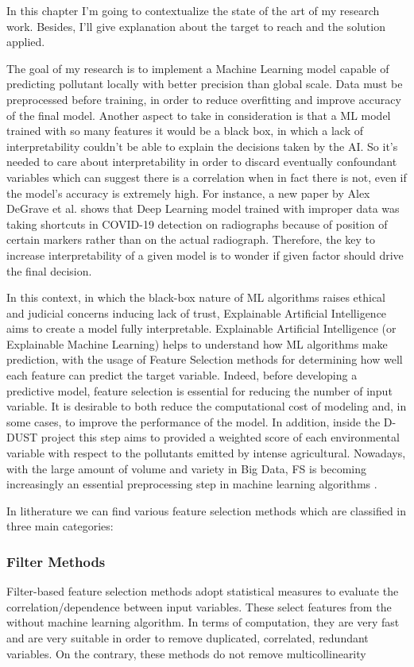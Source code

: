 In this chapter I'm going to contextualize the state of the art of my research work. 
Besides, I'll give explanation about the target to reach and the solution applied.\par
The goal of my research is to implement a Machine Learning model capable of predicting pollutant locally with better precision than global scale. 
Data must be preprocessed before training, in order to reduce overfitting and improve accuracy of the final model.
Another aspect to take in consideration is that a ML model trained with so many features it would be a black box, in which a lack of interpretability couldn't be able to explain the decisions taken by the AI.
So it's needed to care about interpretability in order to discard eventually confoundant variables  which can suggest there is a correlation when in fact there is not, even if the model's accuracy is extremely high. 
For instance, a new paper by Alex DeGrave et al.\cite{degrave2021ai} shows that Deep Learning model trained with improper data was taking shortcuts in COVID-19 detection on radiographs because of position of certain markers rather than on the actual radiograph.
Therefore, the key to increase interpretability of a given model is to wonder if given factor should drive the final decision.\par
In this context, in which the black-box nature of ML algorithms raises ethical and judicial concerns inducing lack of trust, Explainable Artificial Intelligence aims to create a model fully interpretable.
Explainable Artificial Intelligence (or Explainable Machine Learning) helps to understand how ML algorithms make prediction, with the usage of Feature Selection methods for determining how well each feature can predict the target variable.
Indeed, before developing a predictive model, feature selection is essential for reducing the number of input variable. 
It is desirable to both reduce the computational cost of modeling and, in some cases, to improve the performance of the model.
In addition, inside the D-DUST project this step aims to provided a weighted score of each environmental variable with respect to the pollutants emitted by intense agricultural.
Nowadays, with the large amount of volume and variety in Big Data, FS is becoming increasingly an essential preprocessing step in machine learning algorithms \cite{kamolov2021feature}.
\par
In litherature we can find various feature selection methods which are classified in three main categories\cite{stanczyk2015feature}:
\subsubsection{Filter Methods}
Filter-based feature selection methods adopt statistical measures to evaluate the correlation/dependence between input variables.
These select features from the without machine learning algorithm. In terms of computation, they are very fast and are very suitable in order to remove duplicated, correlated, redundant variables. On the contrary, these methods do not remove multicollinearity
